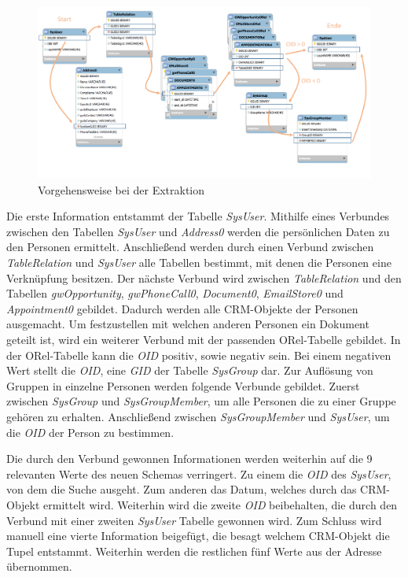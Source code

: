 \begin{figure}[htbp]
\centering
  \includegraphics[width=1.0\textwidth]{pics/konzept_extraktion.pdf}
\caption{Vorgehensweise bei der Extraktion}
\label{umsetzung_extract}
\end{figure} 

Die erste Information entstammt der Tabelle \textit{SysUser}. Mithilfe eines Verbundes zwischen den Tabellen \textit{SysUser} und \textit{Address0} werden die persönlichen Daten zu den Personen ermittelt. Anschließend werden durch einen Verbund zwischen \textit{TableRelation} und \textit{SysUser} alle Tabellen bestimmt, mit denen die Personen eine Verknüpfung besitzen. Der nächste Verbund wird zwischen \textit{TableRelation} und den Tabellen \textit{gwOpportunity}, \textit{gwPhoneCall0}, \textit{Document0}, \textit{EmailStore0} und \textit{Appointment0} gebildet. Dadurch werden alle CRM-Objekte der Personen ausgemacht. Um festzustellen mit welchen anderen Personen ein Dokument geteilt ist, wird ein weiterer Verbund mit der passenden ORel-Tabelle gebildet. In der ORel-Tabelle kann die \textit{OID} positiv, sowie negativ sein. Bei einem negativen Wert stellt die \textit{OID}, eine \textit{GID} der Tabelle \textit{SysGroup} dar. Zur Auflösung von Gruppen in einzelne Personen werden folgende Verbunde gebildet. Zuerst zwischen \textit{SysGroup} und \textit{SysGroupMember}, um alle Personen die zu einer Gruppe gehören zu erhalten. Anschließend zwischen \textit{SysGroupMember} und \textit{SysUser}, um die \textit{OID} der Person zu bestimmen. 

Die durch den Verbund gewonnen Informationen werden weiterhin auf die 9 relevanten Werte des neuen Schemas verringert. Zu einem die \textit{OID} des \textit{SysUser}, von dem die Suche ausgeht. Zum anderen das Datum, welches durch das CRM-Objekt ermittelt wird. Weiterhin wird die zweite \textit{OID} beibehalten, die durch den Verbund mit einer zweiten \textit{SysUser} Tabelle gewonnen wird. Zum Schluss wird manuell eine vierte Information beigefügt, die besagt welchem CRM-Objekt die Tupel entstammt. Weiterhin werden die restlichen fünf Werte aus der Adresse übernommen. 

